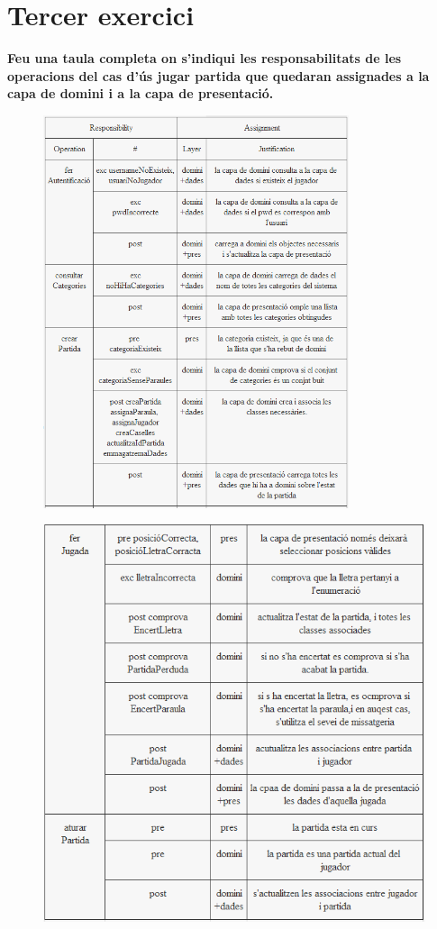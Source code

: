 \section{Tercer exercici}

\textbf{Feu una taula completa on s’indiqui les responsabilitats de les operacions del cas
d’ús jugar partida que quedaran assignades a la capa de domini i a la capa de
presentació.}

    \begin{figure}[h]
    \centering
    \includegraphics[width=0.8\textwidth]{images/taula1.png}
    \end{figure}

    \begin{figure}[h]
    \centering
    \includegraphics[width=1.0\textwidth]{images/taula2.png}
    \end{figure}


